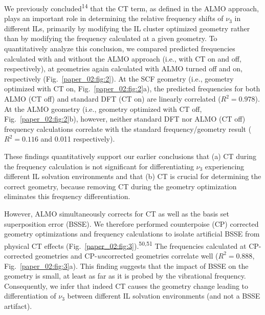 We previously concluded\textsuperscript{14} that the CT term, as defined in the ALMO approach, plays an important role in determining the relative frequency shifts of \(\nu_{3}\) in different ILs, primarily by modifying the \textendash{}IL cluster optimized geometry rather than by modifying the frequency calculated at a given geometry. To quantitatively analyze this conclusion, we compared predicted frequencies calculated with and without the ALMO approach (i.e., with CT on and off, respectively), at geometries again calculated with ALMO turned off and on, respectively (Fig.~\ref{paper_02:fig:2}). At the SCF geometry (i.e., geometry optimized with CT on, Fig.~\ref{paper_02:fig:2}a), the predicted frequencies for both ALMO (CT off) and standard DFT (CT on) are linearly correlated (\(R^2 = 0.978\)). At the ALMO geometry (i.e., geometry optimized with CT off, Fig.~\ref{paper_02:fig:2}b), however, neither standard DFT nor ALMO (CT off) frequency calculations correlate with the standard frequency/geometry result (\(R^2 = 0.116\) and \num{0.011} respectively).

These findings quantitatively support our earlier conclusions that (a) CT during the frequency calculation is not significant for differentiating \(\nu_{3}\) experiencing different IL solvation environments and that (b) CT is crucial for determining the correct geometry, because removing CT during the geometry optimization eliminates this frequency differentiation.

However, ALMO simultaneously corrects for CT as well as the basis set superposition error (BSSE). We therefore performed counterpoise (CP) corrected geometry optimizations and frequency calculations to isolate artificial BSSE from physical CT effects (Fig.~\ref{paper_02:fig:3}).\textsuperscript{50,51} The frequencies calculated at CP-corrected geometries and CP-\emph{un}corrected geometries correlate well (\(R^2 = 0.888\), Fig.~\ref{paper_02:fig:3}a). This finding suggests that the impact of BSSE on the geometry is small, at least as far as it is probed by the vibrational frequency. Consequently, we infer that indeed CT causes the geometry change leading to differentiation of \(\nu_{3}\) between different IL solvation environments (and not a BSSE artifact).

